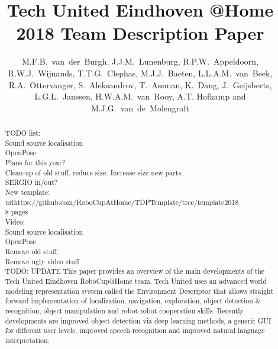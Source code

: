 \documentclass[runningheads,a4paper]{llncs}
\begin{document}
\title{Tech United Eindhoven @Home \\2018 Team Description Paper}
\author{M.F.B.~van~der~Burgh, J.J.M.~Lunenburg, R.P.W.~Appeldoorn, R.W.J.~Wijnands, T.T.G.~Clephas, M.J.J.~Baeten, L.L.A.M.~van~Beek, R.A.~Ottervanger, S.~Aleksandrov, T.~Assman, K.~Dang, J.~Geijsberts, L.G.L.~Janssen, H.W.A.M.~van~Rooy, A.T. Hofkamp and M.J.G.~van~de~Molengraft}

\maketitle



\begin{abstract}
TODO list:\\
Sound source localisation\\
OpenPose\\
Plans for this year?\\
Clean-up of old stuff, reduce size. Increase size new parts.\\
SERGIO in/out?\\
New template: url{https://github.com/RoboCupAtHome/TDPTemplate/tree/template2018}\\
8 pages\\

Video:\\
Sound source localisation\\
OpenPose\\
Remove old stuff.\\
Remove ugly video stuff\\



TODO: UPDATE
This paper provides an overview of the main developments of the Tech United Eindhoven RoboCup@Home team. Tech United uses an advanced world modeling representation system called the Environment Descriptor that allows straight forward implementation of localization, navigation, exploration, object detection \& recognition, object manipulation and robot-robot cooperation skills. Recently developments are improved object detection via deep learning methods, a generic GUI for different user levels, improved speech recognition and improved natural language interpretation.
\end{abstract}
\end{document}

